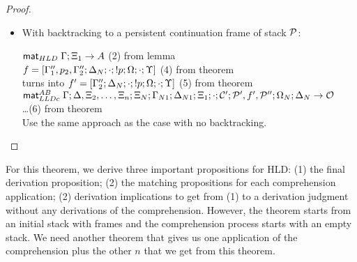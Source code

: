 \begin{proof}
\begin{itemize}[leftmargin=*]
   \item With backtracking to a persistent continuation frame of stack
   $\mathcal{P}$:

      $\mathsf{mat}_{HLD} \; \Gamma; \Xi_1 \rightarrow A$ \hfill (2) from lemma \\

      $f = [\Gamma''_1, p_2, \Gamma''_2; \Delta_N; \cdot; {!} p; \Omega; \cdot; \Upsilon]$ \hfill (4) from theorem \\
      turns into $f' = [\Gamma''_2; \Delta_N; \cdot; {!} p; \Omega; \cdot;
      \Upsilon]$ \hfill (5) from theorem \\

      $\mathsf{mat}_{LLDc}^{AB} \; \Gamma; \Delta, \Xi_2, \dotsc, \Xi_n; \Xi_N; \Gamma_{N1};
\Delta_{N1}; \Xi_1; \cdot; \mathcal{C'}; \mathcal{P'}, f', \mathcal{P''}; \Omega_N; \Delta_N \rightarrow
\mathcal{O}$ \\ \dots \hfill (6) from theorem \\
         
      Use the same approach as the case with no backtracking.
      
\end{itemize}
\end{proof}

For this theorem, we derive three important propositions for HLD: (1) the final
derivation proposition; (2) the matching propositions for each comprehension
application; (2) derivation implications to get from (1) to a derivation
judgment without any derivations of the comprehension. However, the theorem
starts from an initial stack with frames and the comprehension process starts
with an empty stack. We need another theorem that gives us one application of
the comprehension plus the other $n$ that we get from this theorem.

